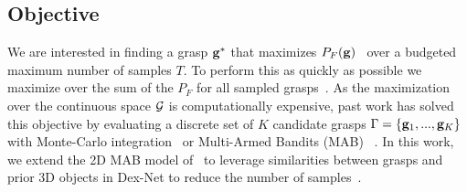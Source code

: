 \subsection{Objective}
We are interested in finding a grasp $\mathbf{g}^*$ that maximizes $P_F(\mathbf{g})$~\cite{kim2012physically, laskey2015bandits, mahler2015gp, weisz2012pose} over a budgeted maximum number of samples $T$.
To perform this as quickly as possible we maximize over the sum of the $P_F$ for all sampled grasps~\cite{laskey2015bandits, srinivas10gaussian}.
As the maximization over the continuous space $\mathcal{G}$ is computationally expensive, past work has solved this objective by evaluating a discrete set of $K$ candidate grasps $\Gamma = \left\{ \mathbf{g}_1, ..., \mathbf{g}_K \right\}$ with Monte-Carlo integration~\cite{kehoe2012toward, weisz2012pose} or Multi-Armed Bandits (MAB) ~\cite{laskey2015bandits}.
In this work, we extend the 2D MAB model of~\cite{laskey2015bandits} to leverage similarities between grasps and prior 3D objects in Dex-Net to reduce the number of samples~\cite{hoffman2013exploiting, pandey2007multi}.